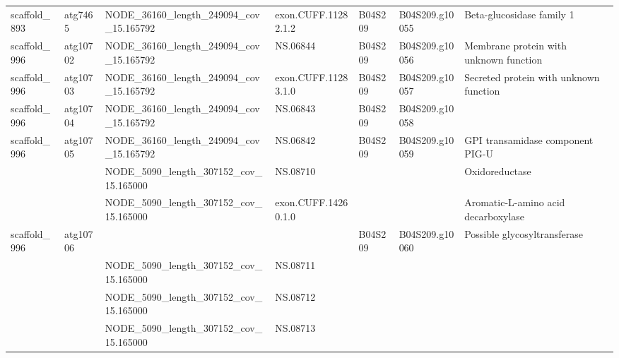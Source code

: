 \begin{longtable}{lllllll}
   scaffold\_893 &   atg7465 &  NODE\_36160\_length\_249094\_cov\_15.165792 &   exon.CUFF.11282.1.2 &      B04S209 &  B04S209.g10055 &                                                       Beta-glucosidase family 1 \\
   scaffold\_996 &  atg10702 &  NODE\_36160\_length\_249094\_cov\_15.165792 &              NS.06844 &      B04S209 &  B04S209.g10056 &                                          Membrane protein with unknown function \\
   scaffold\_996 &  atg10703 &  NODE\_36160\_length\_249094\_cov\_15.165792 &   exon.CUFF.11283.1.0 &      B04S209 &  B04S209.g10057 &                                          Secreted protein with unknown function \\
   scaffold\_996 &  atg10704 &  NODE\_36160\_length\_249094\_cov\_15.165792 &              NS.06843 &      B04S209 &  B04S209.g10058 &                                                                                 \\
   scaffold\_996 &  atg10705 &  NODE\_36160\_length\_249094\_cov\_15.165792 &              NS.06842 &      B04S209 &  B04S209.g10059 &                                                GPI transamidase component PIG-U \\
                &           &   NODE\_5090\_length\_307152\_cov\_15.165000 &              NS.08710 &              &                 &                                                                  Oxidoreductase \\
                &           &   NODE\_5090\_length\_307152\_cov\_15.165000 &   exon.CUFF.14260.1.0 &              &                 &                                             Aromatic-L-amino acid decarboxylase \\
   scaffold\_996 &  atg10706 &                                         &                       &      B04S209 &  B04S209.g10060 &                                                    Possible glycosyltransferase \\
                &           &   NODE\_5090\_length\_307152\_cov\_15.165000 &              NS.08711 &              &                 &                                                                                 \\
                &           &   NODE\_5090\_length\_307152\_cov\_15.165000 &              NS.08712 &              &                 &                                                                                 \\
                &           &   NODE\_5090\_length\_307152\_cov\_15.165000 &              NS.08713 &              &                 &                                                                                 \\

\end{longtable}

